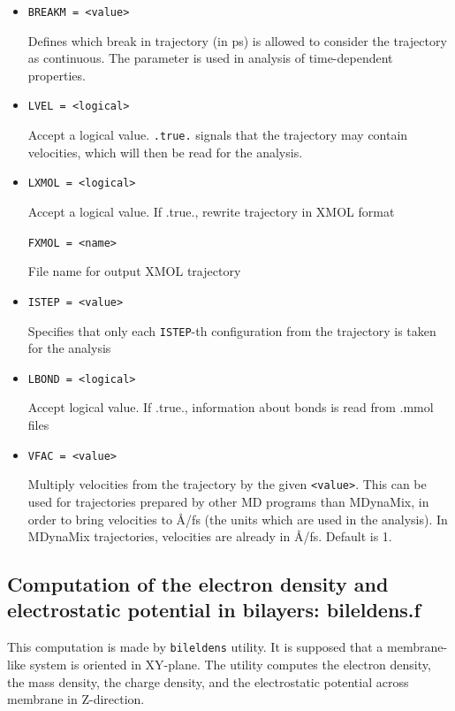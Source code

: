 \documentclass{article}
\begin{document}
\begin{itemize}
\item
\verb|BREAKM = <value>|

Defines which break in trajectory (in ps) is allowed to consider the 
trajectory as continuous. The parameter is used in analysis of time-dependent 
properties.

\item
\verb|LVEL = <logical>|

Accept a logical value. \verb|.true.| signals that the trajectory 
may contain velocities, which will then be read for the analysis.

\item
\verb|LXMOL = <logical>|

Accept a logical value. If .true., rewrite trajectory in XMOL format

\verb|FXMOL = <name>|

File name for output XMOL trajectory

\item
\verb|ISTEP = <value>|

Specifies that only each \verb|ISTEP|-th configuration from the trajectory 
is taken for the analysis

\item
\verb|LBOND = <logical>|

Accept logical value. If .true., information about bonds is read 
from .mmol files

\item
\verb|VFAC = <value>| 

Multiply velocities from the trajectory by the given \verb|<value>|. This
can be used for trajectories prepared by other MD programs than MDynaMix,
in order to bring velocities to \AA/fs (the units which are used in the 
analysis). In MDynaMix trajectories, velocities are already in \AA/fs.  
Default is 1.


\end{itemize}

\subsection{Computation of the electron density and electrostatic potential 
in bilayers: bileldens.f}

This computation is made by \verb|bileldens| utility. It is supposed
that a membrane-like system is oriented in XY-plane. The utility computes
the electron density, the mass density, the charge density, and the 
electrostatic potential across membrane in Z-direction.
\end{document}
